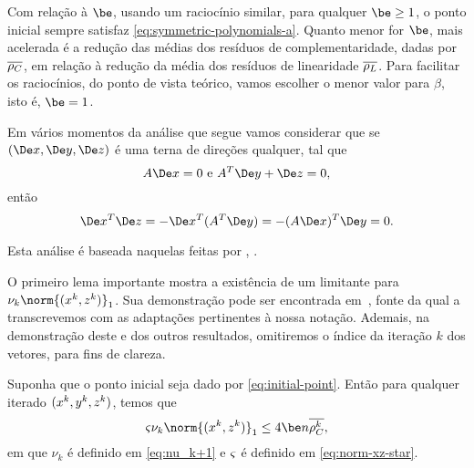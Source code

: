 Com relação à $\be$,  usando um raciocínio similar, para qualquer  $\be\geq 1$, o ponto inicial sempre satisfaz \eqref{eq:symmetric-polynomials-a}. Quanto menor for $\be$, mais acelerada é a redução  das médias dos resíduos de complementaridade, dadas por $\overline{\rho_C}$, em relação à redução da média dos resíduos de linearidade $\overline{\rho_L}$. Para facilitar os raciocínios, do ponto de vista teórico, vamos escolher o menor valor para $\beta$, isto é, $\be=1$.


\begin{obs}
	Em vários momentos da análise que segue vamos considerar que se $(\Dex,\Dey,\Dez)$ é uma terna de direções qualquer,  tal que 
\begin{equation}
	\label{eq:Ax0-ATyz0}
	A\Dex=0 \text{ e } A^T\Dey + \Dez = 0,
\end{equation}
então
\begin{equation}
	\label{eq:xTziszero}
	\Dex^T\Dez =  - \Dex^T(A^T\Dey)  = -(A\Dex)^T\Dey = 0.
\end{equation}
\end{obs}



Esta análise é  baseada naquelas feitas por \textcite[cap. 6]{Wright:Primal-dual-interior-point:1997h},  \textcite{Zhang:2006ic,Zhang:1995fu}. 

O primeiro lema importante mostra a existência de um limitante para $\nu_k\norm{(\xk,\zk)}_{1}$. Sua demonstração pode ser encontrada em~\cite[Lema 6.1]{Wright:Primal-dual-interior-point:1997h}, fonte da qual a transcrevemos com as adaptações pertinentes à nossa notação. Ademais, na demonstração deste e dos outros resultados, omitiremos o índice da iteração $k$ dos vetores, para fins de clareza. 




\begin{lema}\label{lemma:boundxz1}
	Suponha que o ponto inicial seja dado por \eqref{eq:initial-point}. Então para qualquer iterado $(x^k,y^k,z^k)$,  temos que 
	\begin{equation}
		\label{eq:bound-xkzk}
		\bdxzstar\nu_k\norm{(\xk,\zk)}_{1} \leq  4\be n \dbvec{\rho_C^{k}},
	\end{equation}
	em que $\nu_{k}$ é definido em \eqref{eq:nu_k+1} e $\varsigma$ é definido em \eqref{eq:norm-xz-star}.
\end{lema}

